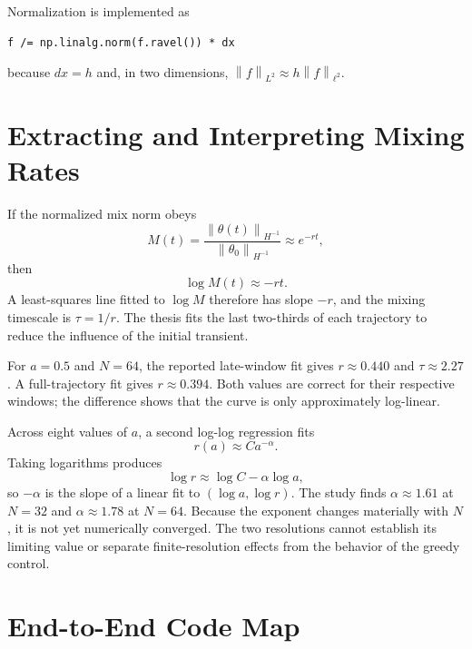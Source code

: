 \documentclass[12pt,a4paper]{article}
\newcommand{\norm}[1]{\left\lVert#1\right\rVert}
\theoremstyle{definition}
\begin{document}
Normalization is implemented as
\begin{lstlisting}[style=python]
f /= np.linalg.norm(f.ravel()) * dx
\end{lstlisting}
because $dx=h$ and, in two dimensions,
$\norm{f}_{L^2}\approx h\norm{f}_{\ell^2}$.

\section{Extracting and Interpreting Mixing Rates}

If the normalized mix norm obeys
\begin{equation}
  M(t)=\frac{\norm{\theta(t)}_{H^{-1}}}
             {\norm{\theta_0}_{H^{-1}}}
  \approx e^{-rt},
\end{equation}
then
\begin{equation}
  \log M(t)\approx -rt.
\end{equation}
A least-squares line fitted to $\log M$ therefore has slope $-r$, and the
mixing timescale is $\tau=1/r$. The thesis fits the last two-thirds of each
trajectory to reduce the influence of the initial transient.

For $a=0.5$ and $N=64$, the reported late-window fit gives
$r\approx0.440$ and $\tau\approx2.27$. A full-trajectory fit gives
$r\approx0.394$. Both values are correct for their respective windows; the
difference shows that the curve is only approximately log-linear.

Across eight values of $a$, a second log-log regression fits
\begin{equation}
  r(a)\approx C a^{-\alpha}.
\end{equation}
Taking logarithms produces
\begin{equation}
  \log r\approx\log C-\alpha\log a,
\end{equation}
so $-\alpha$ is the slope of a linear fit to $(\log a,\log r)$. The study
finds $\alpha\approx1.61$ at $N=32$ and $\alpha\approx1.78$ at $N=64$.
Because the exponent changes materially with $N$, it is not yet numerically
converged. The two resolutions cannot establish its limiting value or
separate finite-resolution effects from the behavior of the greedy control.

\section{End-to-End Code Map}
\end{document}
